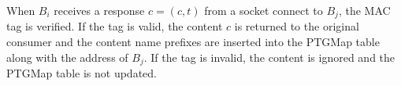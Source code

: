 When $B_i$ receives a response $c = (c,t)$ from a socket connect to $B_j$, the MAC tag is verified. If the tag is valid, the content $c$ is returned to the original consumer and the content name prefixes are inserted into the {\sf PTGMap} table along with the address of $B_j$. If the tag is invalid, the content is ignored and the {\sf PTGMap} table is not updated. 

